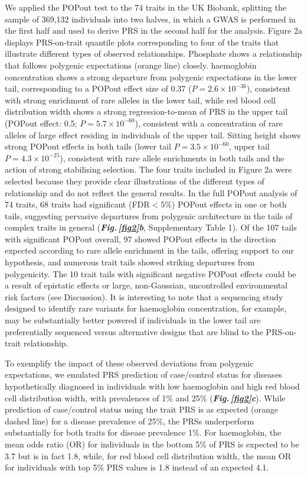 \documentclass[12pt]{zHenriquesLab-StyleBioRxiv}
\newcommand\dref[2]{\normalsize{\textbf{\textit{Fig.\,\ref{#1}#2}}}\normalsize{}}
\begin{document}
%
We applied the POPout test to the 74 traits in the UK Biobank, 
splitting the sample of 369,132 individuals into two halves, 
in which a GWAS is performed in the first half and used to derive 
PRS in the second half for the analysis. 
Figure 2a  displays PRS-on-trait quantile plots corresponding 
to four of the traits that illustrate different types of 
observed relationships. Phosphate shows a relationship that 
follows polygenic expectations (orange line) closely. 
haemoglobin concentration shows a strong departure from 
polygenic expectations in the lower tail, corresponding 
to a POPout effect size of 0.37 ($P = 2.6 \times 10^{-36}$), 
consistent with strong enrichment of rare alleles in the lower 
tail, while red blood cell distribution width shows a strong 
regression-to-mean of PRS in the upper tail (POPout effect: 
0.5; $P = 5.7 \times 10^{-60}$), consistent with a concentration
of rare alleles of large effect residing in individuals of 
the upper tail. Sitting height shows strong POPout effects in both 
tails (lower tail $P = 3.5 \times 10^{-60}$, upper 
tail $P = 4.3 \times 10^{-25}$), consistent with rare allele 
enrichments in both tails and the action of strong 
stabilising selection. The four traits included in Figure 2a 
were selected because they provide clear illustrations 
of the different types of relationship and do not reflect 
the general results. In the full POPout analysis of 74 traits, 
68 traits had significant (FDR$<5\%$) POPout effects in one or both 
tails, suggesting pervasive departures from polygenic 
architecture in the tails of complex traits in 
general (\dref{fig2}{b}, Supplementary Table 1). Of the 107 tails with significant 
POPout overall, 97 showed POPout effects in the 
direction expected according to rare allele enrichment 
in the tails, offering support to our hypothesis, and 
numerous trait tails showed striking departures from polygenicity. 
The 10 trait tails with significant negative POPout effects 
could be a result of epistatic effects or large, non-Gaussian, 
uncontrolled environmental risk factors (see Discussion). 
It is interesting to note that a sequencing study designed 
to identify rare variants for haemoglobin concentration, 
for example, may be substantially better powered if 
individuals in the lower tail are preferentially sequenced 
versus alternative designs that are blind to the PRS-on-trait 
relationship.

To exemplify the impact of these observed deviations from 
polygenic expectations, we emulated PRS prediction of 
case/control status for diseases hypothetically diagnosed 
in individuals with low haemoglobin and high red blood cell 
distribution width, with prevalences of 1\% and 25\% (\dref{fig2}{c}). 
While prediction of case/control status using the trait PRS 
is as expected (orange dashed line) for a disease prevalence 
of 25\%, the PRSs underperform substantially for both 
traits for disease prevalence 1\%. For haemoglobin, the mean 
odds ratio (OR) for individuals in the bottom 5\% of PRS is 
expected to be 3.7 but is in fact 1.8, while, for red blood 
cell distribution width, the mean OR for individuals 
with top 5\% PRS values is 1.8 instead of an expected 4.1.
%
\end{document}
